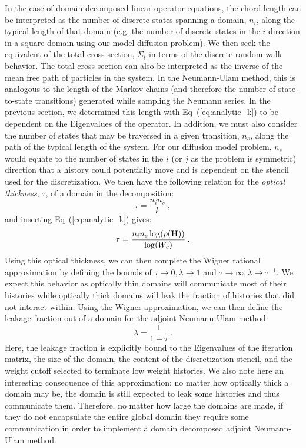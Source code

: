 \documentclass[letterpaper,12pt]{article}
\begin{document}
In the case of domain decomposed linear operator equations, the chord
length can be interpreted as the number of discrete states spanning a
domain, $n_i$, along the typical length of that domain (e.g. the
number of discrete states in the $i$ direction in a square domain
using our model diffusion problem). We then seek the equivalent of the
total cross section, $\Sigma_t$ in terms of the discrete random walk
behavior. The total cross section can also be interpreted as the
inverse of the mean free path of particles in the system. In the
Neumann-Ulam method, this is analogous to the length of the Markov
chains (and therefore the number of state-to-state transitions)
generated while sampling the Neumann series. In the previous section,
we determined this length with Eq~(\ref{eq:analytic_k}) to be
dependent on the Eigenvalues of the operator. In addition, we must
also consider the number of states that may be traversed in a given
transition, $n_s$, along the path of the typical length of the
system. For our diffusion model problem, $n_s$ would equate to the
number of states in the $i$ (or $j$ as the problem is symmetric)
direction that a history could potentially move and is dependent on
the stencil used for the discretization. We then have the following
relation for the \textit{optical thickness}, $\tau$, of a domain in
the decomposition:
\begin{equation}
  \tau = \frac{n_i n_s}{k}\:,
  \label{eq:matrix_optical_thickness}
\end{equation}
and inserting Eq~(\ref{eq:analytic_k}) gives:
\begin{equation}
  \tau = \frac{n_i n_s \log(\rho(\mathbf{H}))}{\log(W_c)}\:.
  \label{eq:matrix_optical_thickness_2}
\end{equation}
Using this optical thickness, we can then complete the Wigner rational
approximation by defining the bounds of $\tau \rightarrow 0, \lambda
\rightarrow 1$ and $\tau \rightarrow \infty, \lambda \rightarrow
\tau^{-1}$. We expect this behavior as optically thin domains will
communicate most of their histories while optically thick domains will
leak the fraction of histories that did not interact within. Using
the Wigner approximation, we can then define the leakage fraction out
of a domain for the adjoint Neumann-Ulam method:
\begin{equation}
  \lambda = \frac{1}{1+\tau}\:.
  \label{eq:analytic_domain_leakage}
\end{equation}
Here, the leakage fraction is explicitly bound to the Eigenvalues of
the iteration matrix, the size of the domain, the content of the
discretization stencil, and the weight cutoff selected to terminate
low weight histories.  We also note here an interesting consequence of
this approximation: no matter how optically thick a domain may be, the
domain is still expected to leak some histories and thus communicate
them. Therefore, no matter how large the domains are made, if they do
not encapsulate the entire global domain they require some
communication in order to implement a domain decomposed adjoint
Neumann-Ulam method.
\end{document}
